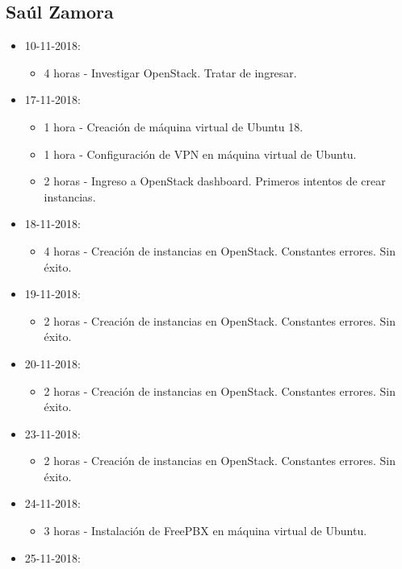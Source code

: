 \documentclass{article}
\begin{document}
\subsection{Sa\'ul Zamora}
\begin{itemize}
  \item 10-11-2018:
  \begin{itemize}
    \item 4 horas - Investigar OpenStack. Tratar de ingresar.
  \end{itemize}
  \item 17-11-2018:
  \begin{itemize}
    \item 1 hora - Creaci\'on de m\'aquina virtual de Ubuntu 18.
    \item 1 hora - Configuraci\'on de VPN en m\'aquina virtual de Ubuntu.
    \item 2 horas - Ingreso a OpenStack dashboard. Primeros intentos de crear instancias.
  \end{itemize}
  \item 18-11-2018:
  \begin{itemize}
    \item 4 horas - Creaci\'on de instancias en OpenStack. Constantes errores. Sin \'exito.
  \end{itemize}
  \item 19-11-2018:
  \begin{itemize}
    \item 2 horas - Creaci\'on de instancias en OpenStack. Constantes errores. Sin \'exito.
  \end{itemize}
  \item 20-11-2018:
  \begin{itemize}
    \item 2 horas - Creaci\'on de instancias en OpenStack. Constantes errores. Sin \'exito.
  \end{itemize}
  \item 23-11-2018:
  \begin{itemize}
    \item 2 horas - Creaci\'on de instancias en OpenStack. Constantes errores. Sin \'exito.
  \end{itemize}
  \item 24-11-2018:
  \begin{itemize}
    \item 3 horas - Instalaci\'on de FreePBX en m\'aquina virtual de Ubuntu.
  \end{itemize}
  \item 25-11-2018:

\end{itemize}
\end{document}
